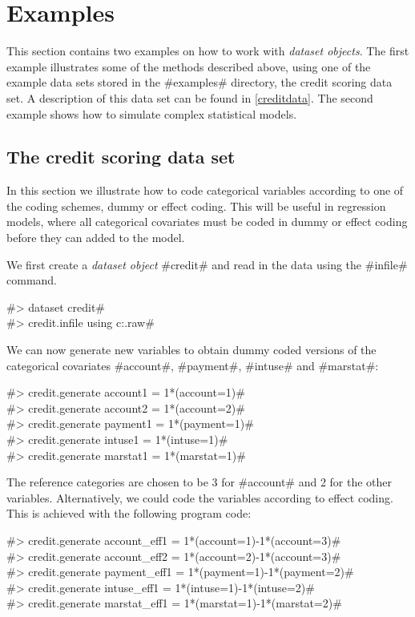 \section{Examples}

This section contains two examples on how to work with {\em
dataset objects}. The first example illustrates some of the
methods described above, using one of the example data sets stored
in the #examples# directory, the credit scoring data set. A
description of this data set can be found in \autoref{creditdata}.
The second example shows how to simulate complex statistical
models.

\subsection{The credit scoring data set}

In this section we illustrate how to code categorical variables
according to one of the coding schemes, dummy or effect coding.
This will be useful in regression models, where all categorical
covariates must be coded in dummy or effect coding before they can
added to the model.

We first create a {\em dataset object} #credit# and read in the data using the #infile# command.

#> dataset credit# \\
#> credit.infile using c:\bayes\examples\credit.raw#

We can now generate new variables to obtain dummy coded versions
of the categorical covariates
#account#, #payment#, #intuse# and #marstat#:

#> credit.generate account1  = 1*(account=1)# \\
#> credit.generate account2  = 1*(account=2)# \\
#> credit.generate payment1 = 1*(payment=1)# \\
#> credit.generate intuse1 = 1*(intuse=1)# \\
#> credit.generate marstat1 = 1*(marstat=1)#

The reference categories are chosen to be 3 for #account# and 2
for the other variables. Alternatively, we could code the
variables according to effect coding. This is achieved with the
following program code:

#> credit.generate account_eff1  = 1*(account=1)-1*(account=3)# \\
#> credit.generate account_eff2  = 1*(account=2)-1*(account=3)# \\
#> credit.generate payment_eff1 = 1*(payment=1)-1*(payment=2)# \\
#> credit.generate intuse_eff1 = 1*(intuse=1)-1*(intuse=2)# \\
#> credit.generate marstat_eff1 = 1*(marstat=1)-1*(marstat=2)#


